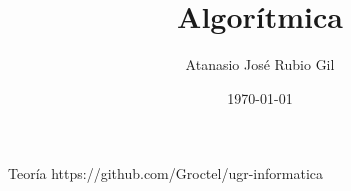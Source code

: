 \documentclass[10pt]{report}
\author{Atanasio José Rubio Gil}
\title{Algorítmica}
\date{\today}
\begin{document}
            {Teoría}
            {https://github.com/Groctel/ugr-informatica}
\tableofcontents


\end{document}
